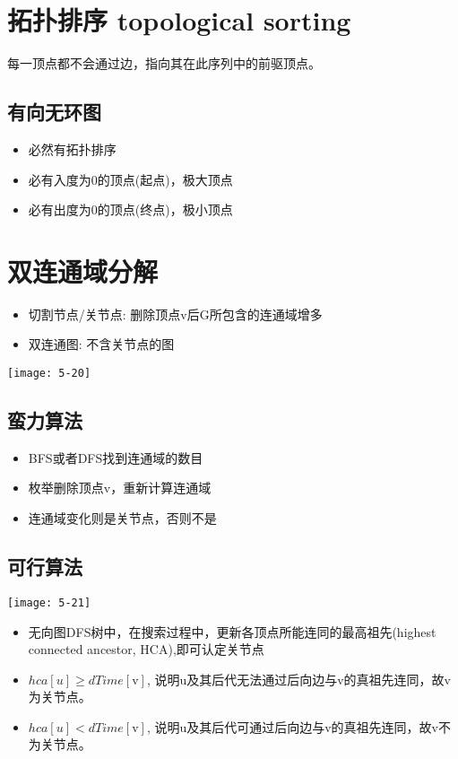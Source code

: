 \section{拓扑排序 topological sorting}
每一顶点都不会通过边，指向其在此序列中的前驱顶点。

\subsection{有向无环图}
\begin{itemize}
\item 必然有拓扑排序
\item 必有入度为0的顶点(起点)，极大顶点
\item 必有出度为0的顶点(终点)，极小顶点
\end{itemize}

\section{双连通域分解}
\begin{itemize}
\item 切割节点/关节点: 删除顶点v后G所包含的连通域增多
\item 双连通图: 不含关节点的图
\end{itemize}
\texttt{[image: 5-20]}

\subsection{蛮力算法}
\begin{itemize}
\item BFS或者DFS找到连通域的数目
\item 枚举删除顶点v，重新计算连通域
\item 连通域变化则是关节点，否则不是
\end{itemize}

\subsection{可行算法}
\texttt{[image: 5-21]}
\begin{itemize}
\item 无向图DFS树中，在搜索过程中，更新各顶点所能连同的最高祖先(highest connected ancestor, HCA),即可认定关节点
\item $hca[{u}] \geq {dTime}[\mathrm{v}]$, 说明u及其后代无法通过后向边与v的真祖先连同，故v为关节点。
\item $hca[{u}] < {dTime}[\mathrm{v}]$, 说明u及其后代可通过后向边与v的真祖先连同，故v不为关节点。 
\end{itemize}


